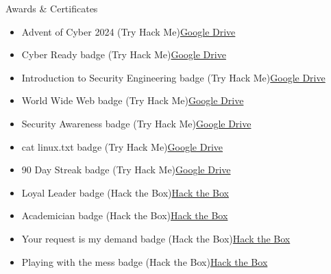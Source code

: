 \documentclass{resume} %
\begin{document}
\begin{rSection}{Awards \& Certificates}
\begin{itemize}
    \item Advent of Cyber 2024 (Try Hack Me)\hfill \href{https://drive.google.com/file/d/1I9dmG63v2PLLt8jlwwu6qE15enm3IUnM/view?usp=drive_link}{Google Drive}
    \item Cyber Ready badge (Try Hack Me)\hfill \href{https://drive.google.com/file/d/1WFawbzzgmxWXgBYT9M29wla1UGReq3cF/view?usp=drive_link}{Google Drive}
    \item Introduction to Security Engineering badge (Try Hack Me)\hfill \href{https://drive.google.com/file/d/1pxh4RiFJmS-4BRhMeF4VNBXKV7maSNxd/view?usp=drive_link}{Google Drive}
    \item World Wide Web badge (Try Hack Me)\hfill \href{https://drive.google.com/file/d/1v2LVqK_OZ14JoF2Z3B3kr9RYG9ZI5Mu7/view?usp=drive_link}{Google Drive}
    \item Security Awareness badge (Try Hack Me)\hfill \href{https://drive.google.com/file/d/1BsS2m20u2rC3LG5sUi4KFrpcCec-VAE8/view?usp=drive_link}{Google Drive}
    \item cat linux.txt badge (Try Hack Me)\hfill \href{https://drive.google.com/file/d/19zQcyrr4fkpgiva6bBSkwFX41_89nEwH/view?usp=drive_link}{Google Drive}
    \item 90 Day Streak badge (Try Hack Me)\hfill \href{https://drive.google.com/file/d/1FAPNc-nzVrZ-g_LYXwd9wG08dO7vfdM1/view?usp=drive_link}{Google Drive}
    \item Loyal Leader badge (Hack the Box)\hfill \href{https://academy.hackthebox.com/achievement/badge/bb4f25cb-059f-11f0-864f-bea50ffe6cb4}{Hack the Box}
    \item Academician badge (Hack the Box)\hfill \href{https://academy.hackthebox.com/achievement/badge/ec44de66-af91-11ef-864f-bea50ffe6cb4}{Hack the Box}
    \item Your request is my demand badge (Hack the Box)\hfill \href{https://academy.hackthebox.com/achievement/badge/8c4f3787-d8cd-11ef-864f-bea50ffe6cb4}{Hack the Box}
    \item Playing with the mess badge (Hack the Box)\hfill \href{https://academy.hackthebox.com/achievement/badge/25d1147c-2855-11f0-864f-bea50ffe6cb4}{Hack the Box}
\end{itemize}
\end{rSection}
\end{document}
